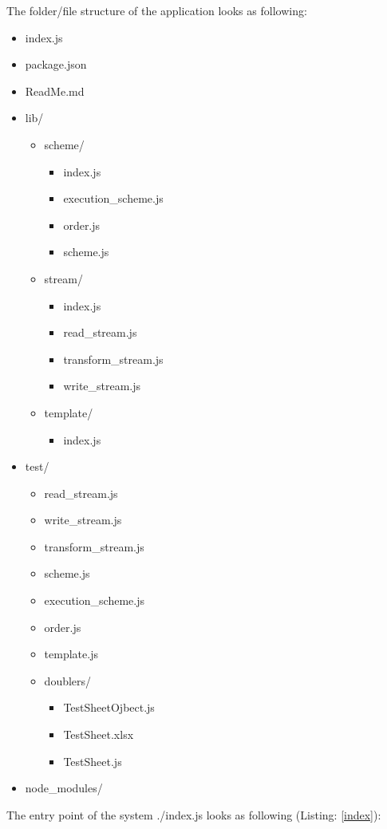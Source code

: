 The folder/file structure of the application looks as following:
\begin{itemize}
	\item index.js
	\item package.json
	\item ReadMe.md
	\item lib/
	\begin{itemize}
		\item scheme/
		\begin{itemize}
			\item index.js
			\item execution\_scheme.js
			\item order.js
			\item scheme.js
		\end{itemize}
		\item stream/
		\begin{itemize}
			\item index.js
			\item read\_stream.js
			\item transform\_stream.js
			\item write\_stream.js
		\end{itemize}
		\item template/
		\begin{itemize}
			\item index.js
		\end{itemize}
	\end{itemize}
	\item test/
	\begin{itemize}
		\item read\_stream.js
		\item write\_stream.js
		\item transform\_stream.js
		\item scheme.js
		\item execution\_scheme.js
		\item order.js
		\item template.js
		\item doublers/
		\begin{itemize}
			\item TestSheetOjbect.js
			\item TestSheet.xlsx
			\item TestSheet.js
		\end{itemize}
	\end{itemize}
	\item node\_modules/
\end{itemize}
The entry point of the system ./index.js looks as following (Listing: \ref{index}):

